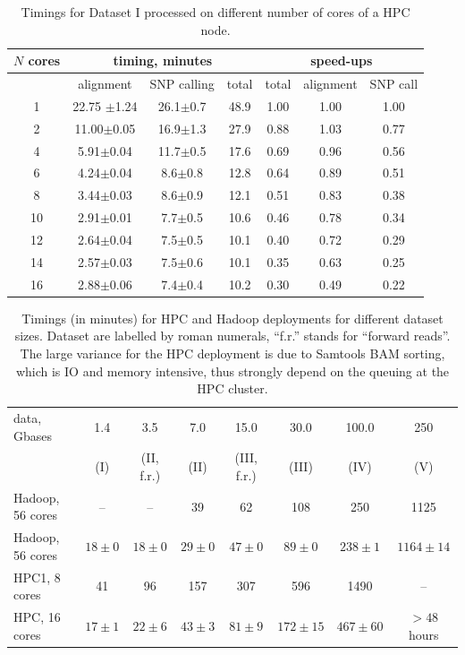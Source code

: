 \documentclass[10pt]{article}
\begin{document}
\begin{table}[!ht]
\small
\caption{Timings for Dataset I processed on different number of cores of a HPC node.}
\begin{center}
\begin{tabular}{c|c|c|c|ccc}
$N$ cores	&\multicolumn{3}{c|}{timing, minutes}&\multicolumn{3}{c}{speed-ups} \\
\hline
	& alignment 	&	SNP calling	&	total  &total & alignment& SNP call\\
\hline
1	&	22.75	$\pm$1.24&	26.1$\pm$0.7	&	48.9	&	 1.00	&	1.00	&	1.00\\
2	&	11.00$\pm$0.05	&	16.9$\pm$1.3	&	27.9	&	 0.88	&	1.03	&	0.77\\
4	&	5.91$\pm$0.04	&	11.7$\pm$0.5	&	17.6	&	 0.69	&	0.96	&	0.56\\
6	&	4.24$\pm$0.04	&	8.6$\pm$0.8	&	12.8	&	 0.64	&	0.89	&	0.51\\
8	&	3.44$\pm$0.03	&	8.6$\pm$0.9	&	12.1	&	 0.51	&	0.83	&	0.38\\
10	&	2.91$\pm$0.01	&	7.7$\pm$0.5	&	10.6	&	 0.46	&	0.78	&	0.34\\
12	&	2.64$\pm$0.04	&	7.5$\pm$0.5	&	10.1	&	 0.40	&	0.72	&	0.29\\
14	&	2.57$\pm$0.03	&	7.5$\pm$0.6	&	10.1	&	 0.35	&	0.63	&	0.25\\
16	&	2.88$\pm$0.06	&	7.4$\pm$0.4	&	10.2	&	 0.30	&	0.49	&	0.22\\
\end{tabular}
\end{center}
\label{table:3}
\normalsize
\end{table}


\begin{table}[!ht]
\small

\caption{Timings  (in minutes) for HPC and  Hadoop deployments for different dataset sizes.    Dataset are labelled by roman numerals, ``f.r.'' stands for ``forward reads''. The large variance for the HPC deployment is due to Samtools BAM sorting, which is IO and memory intensive, thus strongly depend on the queuing at the HPC cluster.}
\begin{center}
\begin{tabular}{l|c|c|c|c|c|c|c}

data, Gbases		&	1.4	&	3.5		&	7.0		&	15.0		&	30.0		&	100.0	&	250 	\\
				&	(I)	&	(II, f.r.)	&	(II)		&	(III, f.r.)	&	(III)		&	(IV)		&	(V)\\
\hline
Hadoop, 56 cores&--&	--	&39		&62	&108	&250&1125\\
Hadoop, 56 cores		&	$18\pm0	$	&	$18\pm0	$	&	$29\pm0$	&	$47\pm0	$	&	$89\pm0$	&	$238\pm1$		&	$1164\pm14$\\
HPC1, 8 cores&	41&	96	&157	&307	&596	&1490&--\\
HPC, 16 cores	&	$17\pm1$	&	$22\pm6$	&	$43\pm3$	&	$81\pm9$	&	$172\pm15$		&	$467\pm60$	& $>48$ hours\\

\end{tabular}
\end{center}
\label{table:4}
\normalsize
\end{table}%
\end{document}
